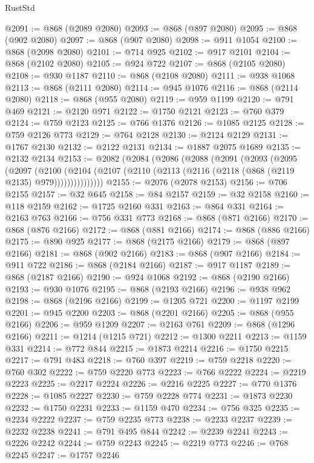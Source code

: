 \begin{lexlean}{RustStd}
\begin{coremodule}
@2091 := @868 (@2089 @2080)
@2093 := @868 (@897 @2080)
@2095 := @868 (@902 @2080)
@2097 := @868 (@907 @2080)
@2098 := @911 @1054
@2100 := @868 (@2098 @2080)
@2101 := @714 @925
@2102 := @917 @2101
@2104 := @868 (@2102 @2080)
@2105 := @924 @722
@2107 := @868 (@2105 @2080)
@2108 := @930 @1187
@2110 := @868 (@2108 @2080)
@2111 := @938 @1068
@2113 := @868 (@2111 @2080)
@2114 := @945 @1076
@2116 := @868 (@2114 @2080)
@2118 := @868 (@955 @2080)
@2119 := @959 @1199
@2120 := @791 @469
@2121 := @2120 @971
@2122 := @1750 @2121
@2123 := @760 @379
@2124 := @759 @2123
@2125 := @766 @1376
@2126 := @1085 @2125
@2128 := @759 @2126 @773
@2129 := @764 @2128
@2130 := @2124 @2129
@2131 := @1767 @2130
@2132 := @2122 @2131
@2134 := @1887 @2075 @1689
@2135 := @2132 @2134
@2153 := @2082
    (@2084
      (@2086
        (@2088
          (@2091
            (@2093
              (@2095
                (@2097
                  (@2100
                    (@2104
                      (@2107 (@2110 (@2113 (@2116 (@2118 (@868 (@2119 @2135) @979)))))))))))))))
@2155 := @2076 (@2078 @2153)
@2156 := @706 @2155
@2157 := @32 @645
@2158 := @84 @2157
@2159 := @32 @2158
@2160 := @118 @2159
@2162 := @1725 @2160 @331
@2163 := @864 @331
@2164 := @2163 @763
@2166 := @756 @331 @773
@2168 := @868 (@871 @2166)
@2170 := @868 (@876 @2166)
@2172 := @868 (@881 @2166)
@2174 := @868 (@886 @2166)
@2175 := @890 @925
@2177 := @868 (@2175 @2166)
@2179 := @868 (@897 @2166)
@2181 := @868 (@902 @2166)
@2183 := @868 (@907 @2166)
@2184 := @911 @722
@2186 := @868 (@2184 @2166)
@2187 := @917 @1187
@2189 := @868 (@2187 @2166)
@2190 := @924 @1068
@2192 := @868 (@2190 @2166)
@2193 := @930 @1076
@2195 := @868 (@2193 @2166)
@2196 := @938 @962
@2198 := @868 (@2196 @2166)
@2199 := @1205 @721
@2200 := @1197 @2199
@2201 := @945 @2200
@2203 := @868 (@2201 @2166)
@2205 := @868 (@955 @2166)
@2206 := @959 @1209
@2207 := @2163 @761
@2209 := @868 (@1296 @2166)
@2211 := @1214 (@1215 @721)
@2212 := @1300 @2211
@2213 := @1159 @331
@2214 := @772 @844
@2215 := @1873 @2214
@2216 := @1750 @2215
@2217 := @791 @483
@2218 := @760 @397
@2219 := @759 @2218
@2220 := @760 @302
@2222 := @759 @2220 @773
@2223 := @766 @2222
@2224 := @2219 @2223
@2225 := @2217 @2224
@2226 := @2216 @2225
@2227 := @770 @1376
@2228 := @1085 @2227
@2230 := @759 @2228 @774
@2231 := @1873 @2230
@2232 := @1750 @2231
@2233 := @1159 @470
@2234 := @756 @325
@2235 := @2234 @2222
@2237 := @759 @2235 @773
@2238 := @2233 @2237
@2239 := @2232 @2238
@2241 := @791 @495 @844
@2242 := @2239 @2241
@2243 := @2226 @2242
@2244 := @759 @2243
@2245 := @2219 @773
@2246 := @768 @2245
@2247 := @1757 @2246

\end{coremodule}
\end{lexlean}
